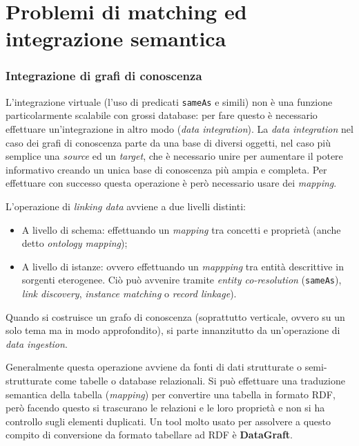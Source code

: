 \documentclass[11pt]{article}
\begin{document}
\newpage
\part{Problemi di matching ed integrazione semantica}
\section{Integrazione di grafi di conoscenza}
L'integrazione virtuale (l'uso di predicati \verb|sameAs| e simili) non è una funzione particolarmente scalabile con grossi database: per fare questo è necessario effettuare un'integrazione in altro modo (\textit{data integration}).
La \textit{data integration} nel caso dei grafi di conoscenza parte da una base di diversi oggetti, nel caso più semplice una \textit{source} ed un \textit{target}, che è necessario unire per aumentare il potere informativo creando un unica base di conoscenza più ampia e completa. Per effettuare con successo questa operazione è però necessario usare dei \textit{mapping}.

L'operazione di \textit{linking data} avviene a due livelli distinti:
\begin{itemize}
\item A livello di schema: effettuando un \textit{mapping} tra concetti e proprietà (anche detto \textit{ontology mapping}); \item A livello di istanze: ovvero effettuando un \textit{mappping} tra entità descrittive in sorgenti eterogenee. Ciò può avvenire tramite \textit{entity co-resolution} (\verb|sameAs|), \textit{link discovery}, \textit{instance matching} o \textit{record linkage}).
\end{itemize}
Quando si costruisce un grafo di conoscenza (soprattutto verticale, ovvero su un solo tema ma in modo approfondito), si parte innanzitutto da un'operazione di \textit{data ingestion}. 

Generalmente questa operazione avviene da fonti di dati strutturate o semi-strutturate come tabelle o database relazionali.
Si può effettuare una traduzione semantica della tabella (\textit{mapping}) per convertire una tabella in formato RDF, però facendo questo si trascurano le relazioni e le loro proprietà e non si ha controllo sugli elementi duplicati. Un tool molto usato per assolvere a questo compito di conversione da formato tabellare ad RDF è \textbf{DataGraft}.
\end{document}
